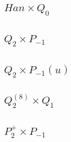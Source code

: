 \subsection*{$Han\times Q_0$}

\subsection*{$Q_2\times P_{-1}$}

\subsection*{$Q_2\times P_{-1}(u)$}

\subsection*{$Q_2^{(8)}\times Q_1$}

\subsection*{$P_2^+\times P_{-1}$}

